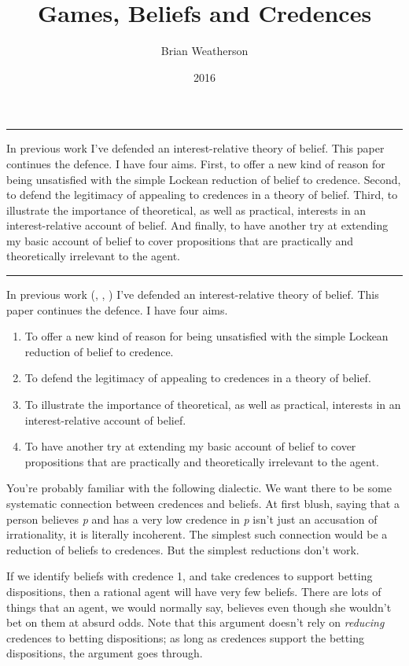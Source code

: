 \documentclass[
  10pt,
  letterpaper,
  DIV=11,
  numbers=noendperiod,
  twoside]{scrartcl}
\title{Games, Beliefs and Credences}
\author{Brian Weatherson}
\date{2016}
\providecommand{\tightlist}{%
  \setlength{\itemsep}{0pt}\setlength{\parskip}{0pt}}\usepackage{longtable,booktabs,array}
\renewenvironment{abstract}
 {\vspace{-1.25cm}
 \quotation\small\noindent\rule{\linewidth}{.5pt}\par\smallskip
 \noindent }
 {\par\noindent\rule{\linewidth}{.5pt}\endquotation}
\begin{document}
\maketitle
\begin{abstract}
In previous work I've defended an interest-relative theory of belief.
This paper continues the defence. I have four aims. First, to offer a
new kind of reason for being unsatisfied with the simple Lockean
reduction of belief to credence. Second, to defend the legitimacy of
appealing to credences in a theory of belief. Third, to illustrate the
importance of theoretical, as well as practical, interests in an
interest-relative account of belief. And finally, to have another try at
extending my basic account of belief to cover propositions that are
practically and theoretically irrelevant to the agent.
\end{abstract}

In previous work (,
,
) I've defended an
interest-relative theory of belief. This paper continues the defence. I
have four aims.

\begin{enumerate}
\def\labelenumi{\arabic{enumi}.}
\tightlist
\item
  To offer a new kind of reason for being unsatisfied with the simple
  Lockean reduction of belief to credence.
\item
  To defend the legitimacy of appealing to credences in a theory of
  belief.
\item
  To illustrate the importance of theoretical, as well as practical,
  interests in an interest-relative account of belief.
\item
  To have another try at extending my basic account of belief to cover
  propositions that are practically and theoretically irrelevant to the
  agent.
\end{enumerate}

You're probably familiar with the following dialectic. We want there to
be some systematic connection between credences and beliefs. At first
blush, saying that a person believes \emph{p} and has a very low
credence in \emph{p} isn't just an accusation of irrationality, it is
literally incoherent. The simplest such connection would be a reduction
of beliefs to credences. But the simplest reductions don't work.

If we identify beliefs with credence 1, and take credences to support
betting dispositions, then a rational agent will have very few beliefs.
There are lots of things that an agent, we would normally say, believes
even though she wouldn't bet on them at absurd odds. Note that this
argument doesn't rely on \emph{reducing} credences to betting
dispositions; as long as credences support the betting dispositions, the
argument goes through.
\end{document}
